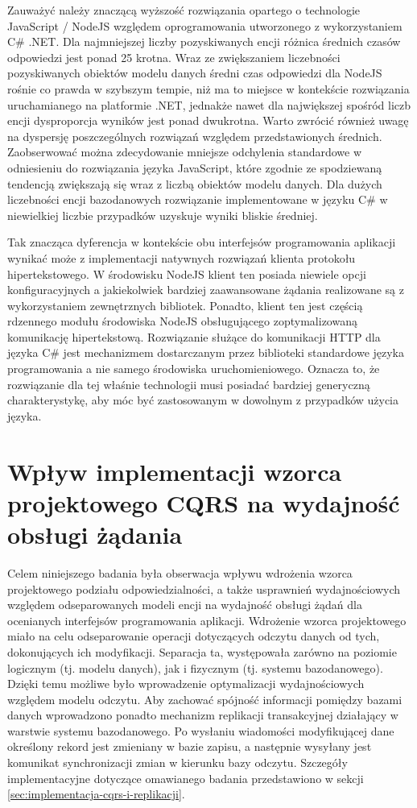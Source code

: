 Zauważyć należy znaczącą wyższość rozwiązania opartego o technologie JavaScript / NodeJS względem oprogramowania utworzonego z wykorzystaniem C\# .NET. Dla najmniejszej liczby pozyskiwanych encji różnica średnich czasów odpowiedzi jest ponad 25 krotna. Wraz ze zwiększaniem liczebności pozyskiwanych obiektów modelu danych średni czas odpowiedzi dla NodeJS rośnie co prawda w szybszym tempie, niż ma to miejsce w kontekście rozwiązania uruchamianego na platformie .NET, jednakże nawet dla największej spośród liczb encji dysproporcja wyników jest ponad dwukrotna. Warto zwrócić również uwagę na dyspersję poszczególnych rozwiązań względem przedstawionych średnich. Zaobserwować można zdecydowanie mniejsze odchylenia standardowe w odniesieniu do rozwiązania języka JavaScript, które zgodnie ze spodziewaną tendencją zwiększają się wraz z liczbą obiektów modelu danych. Dla dużych liczebności encji bazodanowych rozwiązanie implementowane w języku C\# w niewielkiej liczbie przypadków uzyskuje wyniki bliskie średniej.

Tak znacząca dyferencja w kontekście obu interfejsów programowania aplikacji wynikać może z implementacji natywnych rozwiązań klienta protokołu hipertekstowego. W środowisku NodeJS klient ten posiada niewiele opcji konfiguracyjnych a jakiekolwiek bardziej zaawansowane żądania realizowane są z wykorzystaniem zewnętrznych bibliotek. Ponadto, klient ten jest częścią rdzennego modułu środowiska NodeJS obsługującego zoptymalizowaną komunikację hipertekstową. Rozwiązanie służące do komunikacji HTTP dla języka C\# jest mechanizmem dostarczanym przez biblioteki standardowe języka programowania a nie samego środowiska uruchomieniowego. Oznacza to, że rozwiązanie dla tej właśnie technologii musi posiadać bardziej generyczną charakterystykę, aby móc być zastosowanym w dowolnym z przypadków użycia języka.
\section{Wpływ implementacji wzorca projektowego CQRS na wydajność obsługi żądania}
\label{sec:cqrs-and-database-improvements}
Celem niniejszego badania była obserwacja wpływu wdrożenia wzorca projektowego podziału odpowiedzialności, a także usprawnień wydajnościowych względem odseparowanych modeli encji na wydajność obsługi żądań dla ocenianych interfejsów programowania aplikacji. Wdrożenie wzorca projektowego miało na celu odseparowanie operacji dotyczących odczytu danych od tych, dokonujących ich modyfikacji. Separacja ta, występowała zarówno na poziomie logicznym (tj. modelu danych), jak i fizycznym (tj. systemu bazodanowego). Dzięki temu możliwe było wprowadzenie optymalizacji wydajnościowych względem modelu odczytu. Aby zachować spójność informacji pomiędzy bazami danych wprowadzono ponadto mechanizm replikacji transakcyjnej działający w warstwie systemu bazodanowego. Po wysłaniu wiadomości modyfikującej dane określony rekord jest zmieniany w bazie zapisu, a następnie wysyłany jest komunikat synchronizacji zmian w kierunku bazy odczytu. Szczegóły implementacyjne dotyczące omawianego badania przedstawiono w sekcji \ref{sec:implementacja-cqrs-i-replikacji}.

